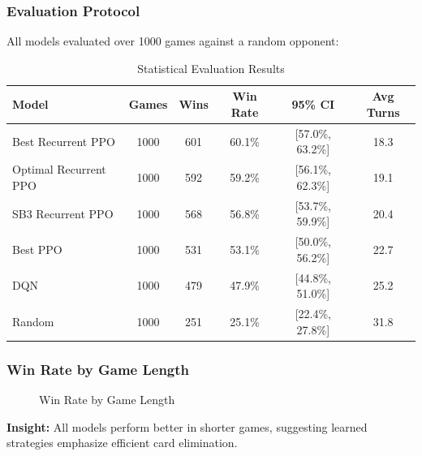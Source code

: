\documentclass[12pt,a4paper]{article}
\begin{document}
\subsubsection{Evaluation Protocol}
All models evaluated over 1000 games against a random opponent:
\begin{table}[H]
\centering
\begin{tabular}{lccccc}
\toprule
\textbf{Model} & \textbf{Games} & \textbf{Wins} & \textbf{Win Rate} & \textbf{95\% CI} & \textbf{Avg Turns} \\
\midrule
Best Recurrent PPO & 1000 & 601 & 60.1\% & [57.0\%, 63.2\%] & 18.3 \\
Optimal Recurrent PPO & 1000 & 592 & 59.2\% & [56.1\%, 62.3\%] & 19.1 \\
SB3 Recurrent PPO & 1000 & 568 & 56.8\% & [53.7\%, 59.9\%] & 20.4 \\
Best PPO & 1000 & 531 & 53.1\% & [50.0\%, 56.2\%] & 22.7 \\
DQN & 1000 & 479 & 47.9\% & [44.8\%, 51.0\%] & 25.2 \\
Random & 1000 & 251 & 25.1\% & [22.4\%, 27.8\%] & 31.8 \\
\bottomrule
\end{tabular}
\caption{Statistical Evaluation Results}
\label{tab:stat_eval}
\end{table}
\subsubsection{Win Rate by Game Length}
\begin{figure}[H]
\centering
{}
\caption{Win Rate by Game Length}
\label{fig:winrate_length}
\end{figure}
\textbf{Insight:} All models perform better in shorter games, suggesting learned strategies emphasize efficient card elimination.
\end{document}
